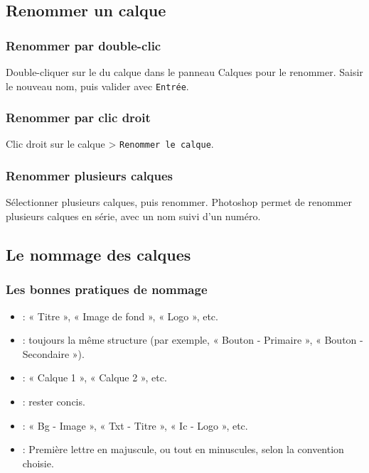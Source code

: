 \subsection{Renommer un calque}

\subsubsection{Renommer par double-clic}

Double-cliquer sur le  du calque dans le panneau Calques pour le renommer. Saisir le nouveau nom, puis valider avec \texttt{Entrée}.

\subsubsection{Renommer par clic droit}

Clic droit sur le calque > \texttt{Renommer le calque}.

\subsubsection{Renommer plusieurs calques}

Sélectionner plusieurs calques, puis renommer. Photoshop permet de renommer plusieurs calques en série, avec un nom suivi d'un numéro.

\subsection{Le nommage des calques}

\subsubsection{Les bonnes pratiques de nommage}

\begin{itemize}
    \item {} : « Titre », « Image de fond », « Logo », etc.
    \item {} : toujours la même structure (par exemple, « Bouton - Primaire », « Bouton - Secondaire »).
    \item {} : « Calque 1 », « Calque 2 », etc.
    \item {} : rester concis.
    \item {} : « Bg - Image », « Txt - Titre », « Ic - Logo », etc.
    \item {} : Première lettre en majuscule, ou tout en minuscules, selon la convention choisie.
\end{itemize}

